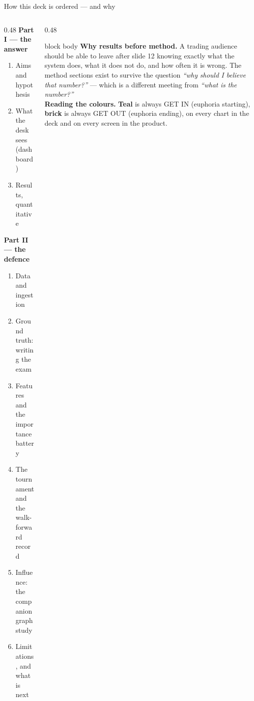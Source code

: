 \documentclass[aspectratio=169,11pt]{beamer}
\begin{document}
\begin{frame}{How this deck is ordered --- and why}
  \begin{columns}[T]
    \begin{column}{0.48\linewidth}
      {\color{gicnavy}\textbf{Part I --- the answer}}
      \begin{enumerate}\small
        \item Aims and hypothesis
        \item What the desk sees (dashboard)
        \item Results, quantitative
      \end{enumerate}
      \vspace{0.8em}
      {\color{gicnavy}\textbf{Part II --- the defence}}
      \begin{enumerate}\small\setcounter{enumi}{3}
        \item Data and ingestion
        \item Ground truth: writing the exam
        \item Features and the importance battery
        \item The tournament and the walk-forward record
        \item Influence: the companion graph study
        \item Limitations, and what is next
      \end{enumerate}
    \end{column}
    \begin{column}{0.48\linewidth}
      \begin{beamercolorbox}[wd=\linewidth,sep=0.8em]{block body}
        \footnotesize
        \textbf{Why results before method.} A trading audience should be able
        to leave after slide 12 knowing exactly what the system does, what it
        does not do, and how often it is wrong. The method sections exist to
        survive the question \emph{``why should I believe that number?''} ---
        which is a different meeting from \emph{``what is the number?''}
        \\[0.6em]
        \textbf{Reading the colours.}
        {\color{bullish}\textbf{Teal}} is always GET IN (euphoria starting),
        {\color{bearish}\textbf{brick}} is always GET OUT (euphoria ending),
        on every chart in the deck and on every screen in the product.
      \end{beamercolorbox}
    \end{column}
  \end{columns}
\end{frame}
\end{document}
